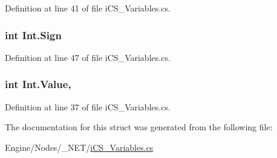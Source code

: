 Definition at line 41 of file i\+C\+S\+\_\+\+Variables.\+cs.

\hypertarget{struct_int_a416e1f5855334378912b031378f5fb26}{
\subsubsection[{Sign}]{\setlength{\rightskip}{0pt plus 5cm}int Int.\+Sign\hspace{0.3cm}{\ttfamily [get]}}}\label{struct_int_a416e1f5855334378912b031378f5fb26}


Definition at line 47 of file i\+C\+S\+\_\+\+Variables.\+cs.

\hypertarget{struct_int_a5e3cbaf337232bde68fe94225f01b46c}{
\subsubsection[{Value}]{\setlength{\rightskip}{0pt plus 5cm}int Int.\+Value\hspace{0.3cm}{\ttfamily [get]}, {\ttfamily [set]}}}\label{struct_int_a5e3cbaf337232bde68fe94225f01b46c}


Definition at line 37 of file i\+C\+S\+\_\+\+Variables.\+cs.



The documentation for this struct was generated from the following file\+:\begin{DoxyCompactItemize}
\item 
Engine/\+Nodes/\+\_\+\+N\+E\+T/\hyperlink{i_c_s___variables_8cs}{i\+C\+S\+\_\+\+Variables.\+cs}\end{DoxyCompactItemize}
